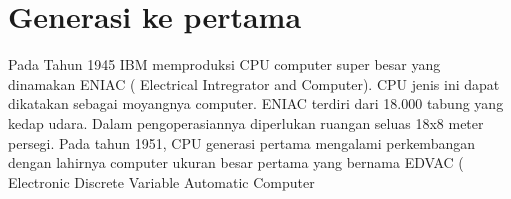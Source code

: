 \section{Generasi ke pertama}
	Pada Tahun 1945 IBM memproduksi CPU computer super besar yang dinamakan ENIAC ( Electrical Intregrator and Computer). CPU jenis ini dapat dikatakan sebagai moyangnya computer. ENIAC  terdiri dari 18.000 tabung yang kedap udara. Dalam pengoperasiannya diperlukan ruangan seluas 18x8 meter persegi.
	Pada tahun 1951, CPU generasi pertama mengalami perkembangan dengan lahirnya computer ukuran besar pertama yang bernama EDVAC ( Electronic Discrete Variable Automatic Computer

